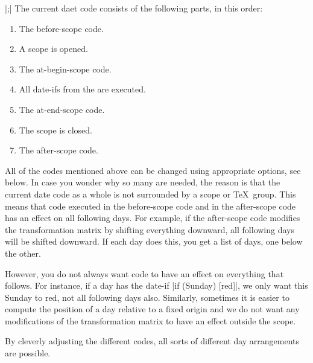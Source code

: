 \begin{command}{\calendar {}|;|}
  The current daet code consists of the following parts, in this order:
  \begin{enumerate}
  \item The before-scope code.
  \item A scope is opened.
  \item The at-begin-scope code.
  \item All date-ifs from the  are
    executed.
  \item The at-end-scope code.
  \item The scope is closed.
  \item The after-scope code.
  \end{enumerate}
  All of the codes mentioned above can be changed using appropriate
  options, see below. In case you wonder why so many are needed, the
  reason is that the current date code as a whole is not
  surrounded by a scope or \TeX\ group. This means that code executed
  in the before-scope code and in the after-scope code has an effect
  on all following days. For example, if the after-scope code modifies
  the transformation matrix by shifting everything downward, all
  following days will be shifted downward. If each day does this, you
  get a list of days, one below the other.

  However, you do not always want code to have an effect on everything
  that follows. For instance, if a day has the date-if
  |if (Sunday) [red]|, we only want this Sunday to red, not all
  following days also. Similarly, sometimes it is easier to compute
  the position of a day relative to a fixed origin and we do not want
  any modifications of the transformation matrix to have an effect
  outside the scope.

  By cleverly adjusting the different codes, all sorts of different
  day arrangements are possible.


\end{command}
